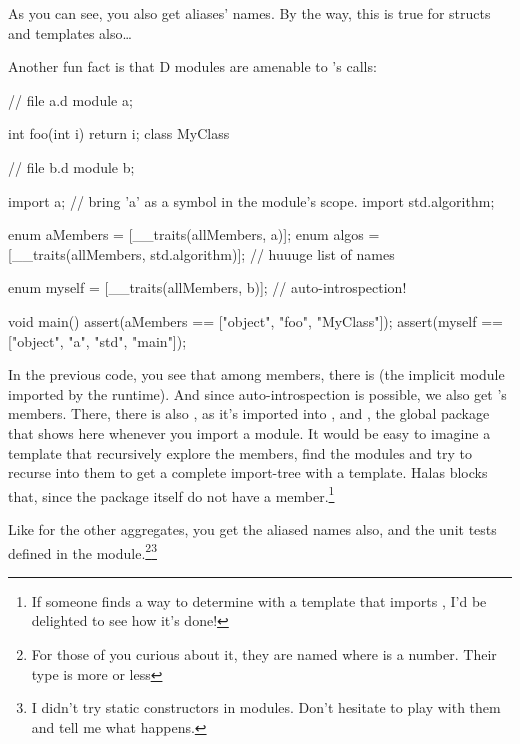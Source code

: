 As you can see, you also get aliases' names. By the way, this is true for structs and templates also\ldots

Another fun fact is that D modules are amenable to 's calls:

\begin{dcode}
// file a.d
module a;

int foo(int i) { return i;}
class MyClass { }
\end{dcode}
\begin{dcode}
// file b.d
module b;

import a; // bring 'a' as a symbol in the module's scope.
import std.algorithm;

enum aMembers = [__traits(allMembers, a)];
enum algos = [__traits(allMembers, std.algorithm)]; // huuuge list of names

enum myself = [__traits(allMembers, b)]; // auto-introspection!

void main()
{
    assert(aMembers == ["object", "foo", "MyClass"]);
    assert(myself   == ["object", "a", "std", "main"]);
}
\end{dcode}

In the previous code, you see that among  members, there is  (the implicit  module imported by the runtime). And since auto-introspection is possible, we also get 's members. There, there is also , as it's imported into , and , the global package that shows here whenever you import a  module. It would be easy to imagine a template that recursively explore the members, find the modules and try to recurse into them to get a complete import-tree with a template. Halas  blocks that, since the package itself do not have a member.\footnote{ If someone finds a way to determine with a template that  imports , I'd be delighted to see how it's done!}

Like for the other aggregates, you get the aliased names also, and the unit tests defined in the module.\footnote{ For those of you curious about it, they are named  where  is a number. Their type is more or less \DD{()}}\footnote{ I didn't try static constructors in modules. Don't hesitate to play with them and tell me what happens.}

